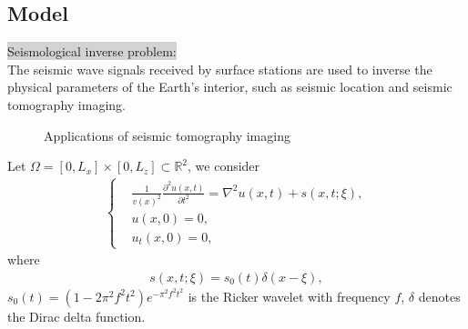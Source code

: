 \documentclass[mathserif,envcountsect,compress,8pt]{beamer}
\begin{document}
\subsection{Model}

\begin{frame}
	\setlength{\parskip}{0.6\baselineskip}
	\normalsize
	\colorbox {lightgray}{{\color{blue}Seismological inverse problem:}}\\
	\vspace{10pt}
	The seismic wave signals received by surface stations are used to
	inverse the physical parameters of the Earth's interior, such as {\color{blue}seismic location} and {\color{blue}seismic tomography imaging}.
	
	\begin{figure}[H]
		\centering
		\centering
		\caption{Applications of seismic tomography imaging}
	\end{figure}
\end{frame}

\begin{frame}
	\setlength{\parskip}{0.6\baselineskip}
	\normalsize
	
	Let $\Omega = [0, L_x] \times [0, L_z] \subset \mathbb{R}^2$, we consider
	\begin{align}\label{fwi_2.1}
		\left \{
		\begin{aligned}
			 & \frac{1}{v(x)^2}\frac{\partial^2u(x,t)}{\partial t^2}=\nabla^2u(x,t)+s(x,t;\xi), \\
			 & u(x,0)=0,                                                                        \\
			 & u_t(x,0)=0,
		\end{aligned}
		\right.
	\end{align}
	where
	\begin{align*}
		s(x,t;\xi)=s_0(t)\delta(x-\xi),
	\end{align*}
	$s_0(t)=(1-2\pi^2 f^2t^2)e^{-\pi^2f^2t^2}$
	is the Ricker wavelet with frequency $f$, $\delta$ denotes the Dirac delta
	function.
\end{frame}
\end{document}
